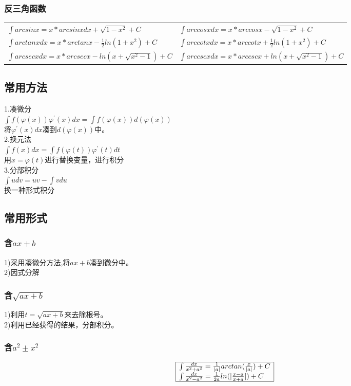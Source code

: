 \documentclass[fleqn]{article}
\begin{document}
\begin{flushleft}
		\subsubsection{反三角函数}
			\begin{tabular}{ll}
				$\int arcsinx=x*arcsinxdx+\sqrt{1-x^2}+C$ & $\int arccosxdx=x*arccosx-\sqrt{1-x^2}+C$\\
				$\int arctanxdx=x*arctanx-\frac{1}{2}ln(1+x^2)+C$ & $\int arccotxdx=x*arccotx+\frac{1}{2}ln(1+x^2)+C $\\
				$\int arcsecxdx=x*arcsecx-ln(x+\sqrt{x^2-1})+C $ & $\int arccscxdx=x*arccscx+ln(x+\sqrt{x^2-1})+C$
			\end{tabular}
	\subsection{常用方法}
		1.凑微分\\
		$\int f(\varphi(x))\varphi^{'}(x)dx=\int f(\varphi(x))d(\varphi(x))$\\
		将$\varphi^{'}(x)dx$凑到$d(\varphi(x))$中。\\
		2.换元法\\
		$\int f(x)dx=\int f(\varphi(t))\varphi^{'}(t)dt$\\
		用$x=\varphi(t)$进行替换变量，进行积分\\
		3.分部积分\\
		$\int udv=uv-\int vdu$\\
		换一种形式积分
	\subsection{常用形式}
		\subsubsection{含$ax+b$}
		1)采用凑微分方法,将$ax+b$凑到微分中。\\
		2)因式分解\\
		\subsubsection{含$\sqrt{ax+b}$}
		1)利用$t=\sqrt{ax+b}$来去除根号。\\
		2)利用已经获得的结果，分部积分。\\
		\subsubsection{含$a^2 \pm x^2$}	
		\[
		\begin{array}{|l|}
			\hline
			\int\frac{dx}{x^2+a^2}=\frac{1}{|a|}arctan(\frac{x}{|a|})+C \\
			\int\frac{dx}{x^2-a^2}=\frac{1}{2a}ln(|\frac{x-a}{x+a}|)+C \\
			\hline
		\end{array}
		\]

\end{flushleft}
\end{document}
